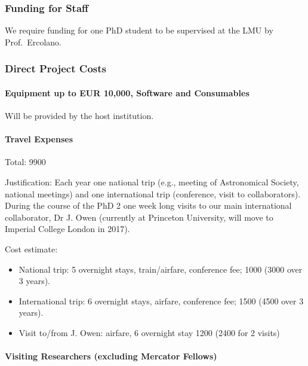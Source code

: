 \documentclass[10pt,fleqn,twoside]{article}
\begin{document}
\subsubsection{Funding for Staff}

We require funding for one PhD student to be supervised at the LMU
by Prof.\ Ercolano.

\subsubsection{Direct Project Costs}

\paragraph{Equipment up to EUR 10,000, Software and Consumables}

Will be provided by the host institution. 

\paragraph{Travel Expenses}

Total: 9900 \EUR{}

Justification: Each year one national trip (e.g., meeting of
Astronomical Society, national meetings) and one international trip
(conference, visit to collaborators). During the course of the PhD 2
one week long visits to our main international collaborator, Dr J.
Owen (currently at Princeton University, will move to Imperial College
London in 2017).

Cost estimate: 
\begin{itemize}
\item National trip: 5 overnight stays, train/airfare,
conference fee; 1000 \EUR{} (3000 over 3 years).
\item International trip: 6 overnight stays, airfare, conference fee;
  1500 \EUR{} (4500 over 3 years).
\item Visit to/from J. Owen: airfare, 6 overnight stay 1200 \EUR{} (2400
  for 2 visits)
\end{itemize}


\paragraph{Visiting Researchers (excluding Mercator Fellows)}
\end{document}
